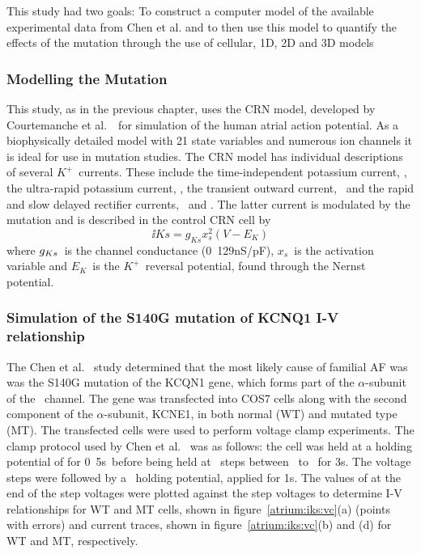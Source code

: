 This study had two goals: To construct a computer model of the available
experimental data from Chen et al. and to then use this model to quantify the
effects of the mutation through the use of cellular, 1D, 2D and 3D models

\subsubsection{Modelling the Mutation}

This study, as in the previous chapter, uses the CRN model, developed by
Courtemanche et al.~\cite{CRN98}\ for simulation of the human atrial action
potential.
As a biophysically detailed model with 21 state variables and numerous ion
channels it is ideal for use in mutation studies.
The CRN model has individual descriptions of several $K^{+}$\ currents.
These include the time-independent potassium current, , the ultra-rapid
potassium current, , the transient outward current, \ and the
rapid and slow delayed rectifier currents, \ and .
The latter current is modulated by the mutation and is described in the control
CRN cell by
\begin{equation}
\label{atrium:iks_con}
\ii{Ks} = g_{Ks}x_{s}^{2}\left(V-E_{K}\right)
\end{equation}
where $g_{\tiny{Ks}}$\ is the channel conductance (\unit{0.129}{nS/pF}), $x_{s}$\ is
the activation variable and $E_{K}$\ is the $K^{+}$\ reversal potential, found
through the Nernst potential.

\subsubsection{Simulation of the S140G mutation of KCNQ1 I-V relationship}

The Chen et al.~\cite{Chen2003} study determined that the most likely cause of
familial AF was was the S140G mutation of the KCQN1 gene, which forms part of
the $\alpha$-subunit of the \ channel.
The gene was transfected into COS7 cells along with the second component of
the $\alpha$-subunit, KCNE1, in both normal (WT) and mutated type (MT).
The transfected cells were used to perform voltage clamp experiments.
The clamp protocol used by Chen et al.~\cite{Chen2003} was as follows:
the cell was held at a holding potential of  for \unit{0.5}{s}\ before
being held at \ steps between \ to \ for \unit{3}{s}.
The voltage steps were followed by a \ holding potential, applied for
\unit{1}{s}.
The values of  at the end of the step voltages were plotted against the
step voltages to determine  I-V relationships for WT
and MT cells, shown in figure~\ref{atrium:iks:vc}(a) (points with errors) and
current traces, shown in figure~\ref{atrium:iks:vc}(b) and (d) for WT and MT,
respectively.

